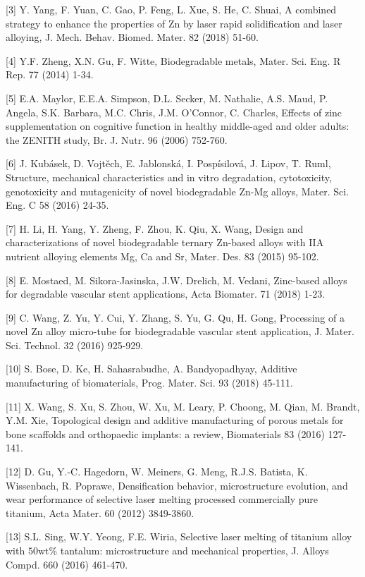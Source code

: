 \documentclass[10pt]{article}
\begin{document}
[3] Y. Yang, F. Yuan, C. Gao, P. Feng, L. Xue, S. He, C. Shuai, A combined strategy to enhance the properties of $\mathrm{Zn}$ by laser rapid solidification and laser alloying, J. Mech. Behav. Biomed. Mater. 82 (2018) 51-60.

[4] Y.F. Zheng, X.N. Gu, F. Witte, Biodegradable metals, Mater. Sci. Eng. R Rep. 77 (2014) 1-34.

[5] E.A. Maylor, E.E.A. Simpson, D.L. Secker, M. Nathalie, A.S. Maud, P. Angela, S.K. Barbara, M.C. Chris, J.M. O'Connor, C. Charles, Effects of zinc supplementation on cognitive function in healthy middle-aged and older adults: the ZENITH study, Br. J. Nutr. 96 (2006) 752-760.

[6] J. Kubásek, D. Vojtěch, E. Jablonská, I. Pospísilová, J. Lipov, T. Ruml, Structure, mechanical characteristics and in vitro degradation, cytotoxicity, genotoxicity and mutagenicity of novel biodegradable Zn-Mg alloys, Mater. Sci. Eng. C 58 (2016) 24-35.

[7] H. Li, H. Yang, Y. Zheng, F. Zhou, K. Qiu, X. Wang, Design and characterizations of novel biodegradable ternary Zn-based alloys with IIA nutrient alloying elements Mg, Ca and Sr, Mater. Des. 83 (2015) 95-102.

[8] E. Mostaed, M. Sikora-Jasinska, J.W. Drelich, M. Vedani, Zinc-based alloys for degradable vascular stent applications, Acta Biomater. 71 (2018) 1-23.

[9] C. Wang, Z. Yu, Y. Cui, Y. Zhang, S. Yu, G. Qu, H. Gong, Processing of a novel Zn alloy micro-tube for biodegradable vascular stent application, J. Mater. Sci. Technol. 32 (2016) 925-929.

[10] S. Bose, D. Ke, H. Sahasrabudhe, A. Bandyopadhyay, Additive manufacturing of biomaterials, Prog. Mater. Sci. 93 (2018) 45-111.

[11] X. Wang, S. Xu, S. Zhou, W. Xu, M. Leary, P. Choong, M. Qian, M. Brandt, Y.M. Xie, Topological design and additive manufacturing of porous metals for bone scaffolds and orthopaedic implants: a review, Biomaterials 83 (2016) 127-141.

[12] D. Gu, Y.-C. Hagedorn, W. Meiners, G. Meng, R.J.S. Batista, K. Wissenbach, R. Poprawe, Densification behavior, microstructure evolution, and wear performance of selective laser melting processed commercially pure titanium, Acta Mater. 60 (2012) 3849-3860.

[13] S.L. Sing, W.Y. Yeong, F.E. Wiria, Selective laser melting of titanium alloy with $50 \mathrm{wt} \%$ tantalum: microstructure and mechanical properties, J. Alloys Compd. 660 (2016) 461-470.
\end{document}
